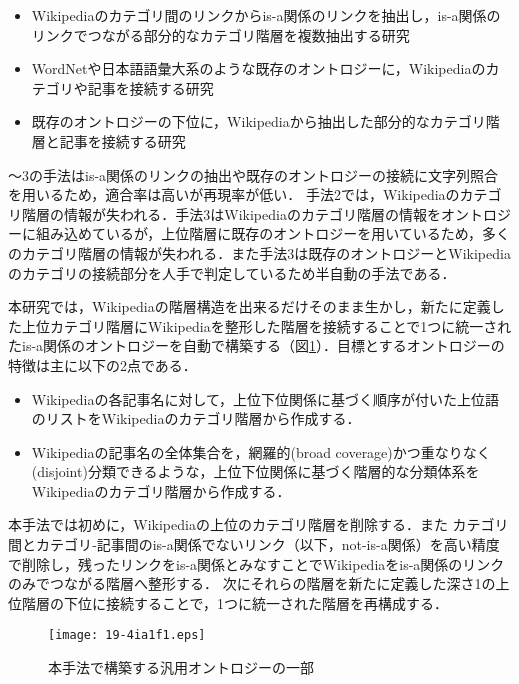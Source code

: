 \documentclass[japanese]{jnlp_1.4}
\begin{document}
\begin{itemize}
\item[1.]
Wikipediaのカテゴリ間のリンクからis-a関係のリンクを抽出し，is-a関係のリンクでつながる部分的なカテゴリ階層を複数抽出する研究\cite{Ponzetto,Sakurai,Tamagawa}
\item[2.]
WordNetや日本語語彙大系のような既存のオントロジーに，Wikipediaのカテゴリや記事を接続する研究\cite{Suchanek,Kobayashi,Kobayashi2}
\item[3.]
既存のオントロジーの下位に，Wikipediaから抽出した部分的なカテゴリ階層と記事を接続する研究\cite{Shibaki}\end{itemize}

〜3の手法はis-a関係のリンクの抽出や既存のオントロジーの接続に文字列照合を用いるため，適合率は高いが再現率が低い．
手法2では，Wikipediaのカテゴリ階層の情報が失われる．手法3はWikipediaのカテゴリ階層の情報をオントロジーに組み込めているが，上位階層に既存のオントロジーを用いているため，多くのカテゴリ階層の情報が失われる．また手法3は既存のオントロジーとWikipediaのカテゴリの接続部分を人手で判定しているため半自動の手法である．

本研究では，Wikipediaの階層構造を出来るだけそのまま生かし，新たに定義した上位カテゴリ階層にWikipediaを整形した階層を接続することで1つに統一されたis-a関係のオントロジーを自動で構築する（図\ref{fig:image}）．目標とするオントロジーの特徴は主に以下の2点である．

\begin{itemize}
\item[1.]
Wikipediaの各記事名に対して，上位下位関係に基づく順序が付いた上位語のリストをWikipediaのカテゴリ階層から作成する．
\item[2.]
Wikipediaの記事名の全体集合を，網羅的(broad coverage)かつ重なりなく(disjoint)分類できるような，上位下位関係に基づく階層的な分類体系をWikipediaのカテゴリ階層から作成する．
\end{itemize}

\noindent
本手法では初めに，Wikipediaの上位のカテゴリ階層を削除する．また
カテゴリ間とカテゴ\mbox{リ‐}記事間のis-a関係でないリンク（以下，not-is-a関係）を高い精度で削除し，残ったリンクをis-a関係とみなすことでWikipediaをis-a関係のリンクのみでつながる階層へ整形する．
次にそれらの階層を新たに定義した深さ1の上位階層の下位に接続することで，1つに統一された階層を再構成する．

\begin{figure}[t]
\begin{center}
\texttt{[image: 19-4ia1f1.eps]}
\end{center}
\caption{本手法で構築する汎用オントロジーの一部}
\label{fig:image}
\vspace{-4pt}
\end{figure}
\end{document}
